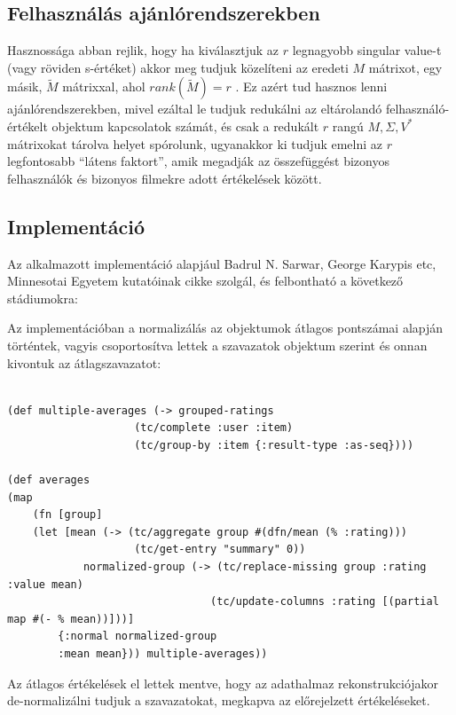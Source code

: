 \documentclass[final, 12pt] {ubb_dolgozat}{book}
\begin{document}
\subsection{Felhasználás ajánlórendszerekben}
\label{sec:orge4fc295}
Hasznossága abban rejlik, hogy ha kiválasztjuk az \(r\) legnagyobb singular value-t (vagy röviden s-értéket) akkor meg tudjuk közelíteni az eredeti \(M\) mátrixot, egy másik, \(\widetilde{M}\) mátrixxal, ahol
\(rank(\widetilde{M}) = r\) \citep{eckartApproximationOneMatrix1936a}. Ez azért tud hasznos lenni ajánlórendszerekben, mivel ezáltal le tudjuk redukálni az eltárolandó felhasználó-értékelt objektum
kapcsolatok számát, és csak a redukált \(r\) rangú \(M, \Sigma, V^{*}\) mátrixokat tárolva helyet spórolunk, ugyanakkor ki tudjuk emelni az \(r\) legfontosabb ``látens faktort'', amik megadják az összefüggést
bizonyos felhasználók és bizonyos filmekre adott értékelések között.

\subsection{Implementáció}
\label{sec:orgdd31aa7}
Az alkalmazott implementáció alapjául Badrul N. Sarwar, George Karypis etc, Minnesotai Egyetem kutatóinak cikke szolgál, \citep{sarwarApplicationDimensionalityReduction2000}
és felbontható a következő stádiumokra:

Az implementációban a normalizálás az objektumok átlagos pontszámai alapján történtek, vagyis csoportosítva lettek a szavazatok objektum szerint és onnan kivontuk az átlagszavazatot:

\begin{verbatim}

(def multiple-averages (-> grouped-ratings
                    (tc/complete :user :item)
                    (tc/group-by :item {:result-type :as-seq})))

(def averages
(map
    (fn [group]
    (let [mean (-> (tc/aggregate group #(dfn/mean (% :rating)))
                    (tc/get-entry "summary" 0))
            normalized-group (-> (tc/replace-missing group :rating :value mean)
                                (tc/update-columns :rating [(partial map #(- % mean))]))]
        {:normal normalized-group
        :mean mean})) multiple-averages))
\end{verbatim}

Az átlagos értékelések el lettek mentve, hogy az adathalmaz rekonstrukciójakor de-normalizálni tudjuk a szavazatokat, megkapva az előrejelzett értékeléseket.
\end{document}
